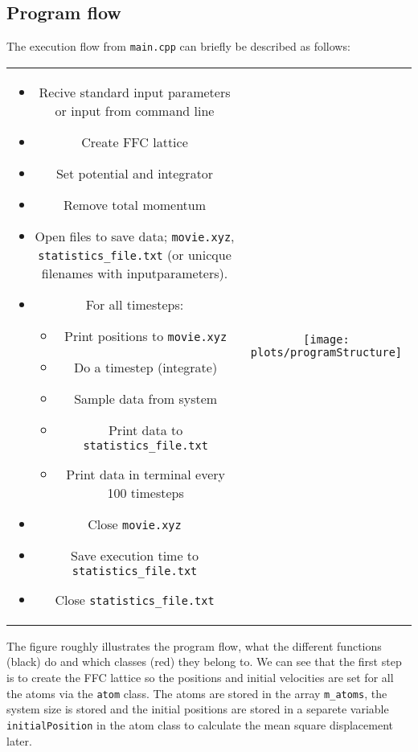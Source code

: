\documentclass[11pt,a4wide]{article}
\begin{document}
\subsection{Program flow}
The execution flow from \texttt{main.cpp} can briefly be described as follows:

\begin{tabular}{cc}
\begin{minipage}{0.45\textwidth}
\begin{itemize}
\item Recive standard input parameters or input from command line
\item Create FFC lattice
\item Set potential and integrator
\item Remove total momentum
\item Open files to save data; \texttt{movie.xyz}, \texttt{statistics\_file.txt} (or unicque filenames with inputparameters).
\item For all timesteps:
\begin{itemize}
\item Print positions to \texttt{movie.xyz}
\item Do a timestep (integrate)
\item Sample data from system
\item Print data to \texttt{statistics\_file.txt}
\item Print data in terminal every 100 timesteps
\end{itemize}
\item Close \texttt{movie.xyz}
\item Save execution time to \texttt{statistics\_file.txt}
\item Close \texttt{statistics\_file.txt}
\end{itemize}
\end{minipage}
&
\begin{minipage}{0.45\textwidth}
\texttt{[image: plots/programStructure]}
\end{minipage}

\end{tabular}

\medskip
The figure roughly illustrates the program flow, what the different functions (black) do and which classes (red) they belong to. We can see that the first step is to create the FFC lattice so the positions and initial velocities are set for all the atoms via the \texttt{atom} class. The atoms are stored in the array \texttt{m\_atoms}, the system size is stored and the initial positions are stored in a separete variable \texttt{initialPosition} in the atom class to calculate the mean square displacement later.
\end{document}
